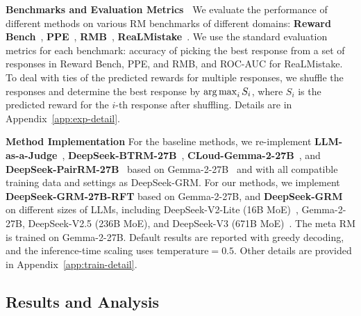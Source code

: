 \documentclass{article} %
\newcommand{\SGRMAll}{DeepSeek-GRM\xspace}
\newcommand{\SGRMRFT}{DeepSeek-GRM-27B-RFT\xspace}
\newcommand{\BTRM}{DeepSeek-BTRM\xspace}
\newcommand{\PairRM}{DeepSeek-PairRM\xspace}
\begin{document}
\noindent\textbf{Benchmarks and Evaluation Metrics\ }
We evaluate the performance of different methods on various RM benchmarks of different domains: \textbf{Reward Bench}~\citep{lambert2024rewardbenchevaluatingrewardmodels}, \textbf{PPE}~\citep{frick2025how}, \textbf{RMB}~\citep{zhou2025rmb}, \textbf{ReaLMistake}~\citep{kamoi2024evaluating}. We use the standard evaluation metrics for each benchmark: accuracy of picking the best response from a set of responses in Reward Bench, PPE, and RMB, and ROC-AUC for ReaLMistake. To deal with ties of the predicted rewards for multiple responses, we shuffle the responses and determine the best response by $\operatorname*{arg\,max}_{i} S_i$, where $S_i$ is the predicted reward for the $i$-th response after shuffling. Details are in Appendix~\ref{app:exp-detail}. 

\noindent\textbf{Method Implementation}
For the baseline methods, we re-implement \textbf{LLM-as-a-Judge}~\citep{chatbot-arena}, \textbf{\BTRM-27B}~\citep{0627eaad-0ecb-353b-9c3d-81e29de3658f}, \textbf{CLoud-Gemma-2-27B}~\citep{ankner2024critiqueoutloudrewardmodels}, and \textbf{\PairRM-27B}~\citep{jiang-etal-2023-llm} based on Gemma-2-27B~\citep{gemmateam2024gemma2improvingopen} and with all compatible training data and settings as \SGRMAll. For our methods, we implement \textbf{\SGRMRFT} based on Gemma-2-27B, and \textbf{\SGRMAll} on different sizes of LLMs, including DeepSeek-V2-Lite (16B MoE)~\citep{deepseekai2024deepseekv2strongeconomicalefficient}, Gemma-2-27B, DeepSeek-V2.5 (236B MoE), and DeepSeek-V3 (671B MoE)~\citep{deepseekai2024deepseekv3technicalreport}. The meta RM is trained on Gemma-2-27B. 
Default results are reported with greedy decoding, and the inference-time scaling uses $\mathrm{temperature}=0.5$. 
Other details are provided in Appendix~\ref{app:train-detail}. 

\vspace{-0.5em}
\subsection{Results and Analysis}\label{sec:main-results}
\end{document}
